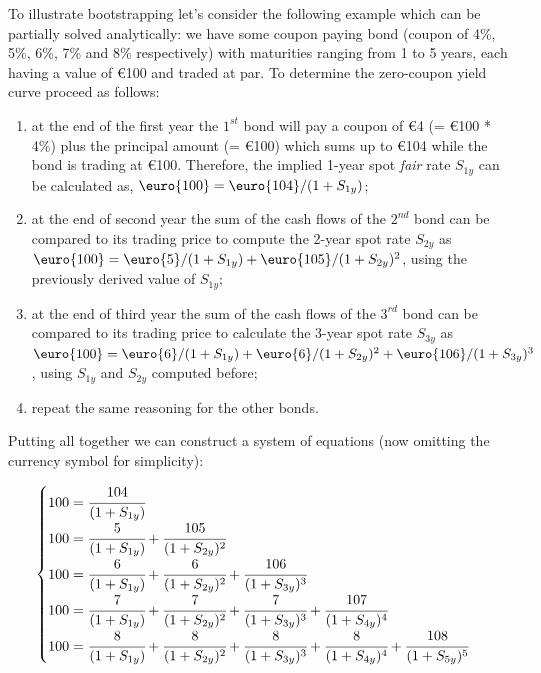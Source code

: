 To illustrate bootstrapping let's consider the following example which can be partially solved analytically: we have some coupon paying bond (coupon of 4\%, 5\%, 6\%, 7\% and 8\% respectively) with maturities ranging from 1 to 5 years, each having a value of \euro{100} and traded at par. To determine the zero-coupon yield curve proceed as follows:

\begin{enumerate}
\item at the end of the first year the $1^{st}$ bond will pay a coupon of \euro{4} (= \euro{100} * 4\%) plus the principal amount (= \euro{100}) which sums up to \euro{104} while the bond is trading at \euro{100}. Therefore, the implied 1-year spot \emph{fair} rate $S_{1y}$ can be calculated as, $\mbox{\euro{100}} = \mbox{\euro{104}} / (1 + S_{1y})$;

\item at the end of second year the sum of the cash flows of the $2^{nd}$ bond can be compared to its trading price to compute the 2-year spot rate $S_{2y}$ as $\mbox{\euro{100}} = \mbox{\euro{5}} / (1 + S_{1y}) + \mbox{\euro{105}} / (1 + S_{2y})^{2}$, using the previously derived value of $S_{1y}$;

\item at the end of third year the sum of the cash flows of the $3^{rd}$ bond can be compared to its trading price to calculate the 3-year spot rate $S_{3y}$ as $\mbox{\euro{100}} = \mbox{\euro{6}} / (1 + S_{1y}) + \mbox{\euro{6}} / (1 + S_{2y})^{2} + \mbox{\euro{106}} / (1 + S_{3y})^{3}$, using $S_{1y}$ and $S_{2y}$ computed before;

\item repeat the same reasoning for the other bonds.
\end{enumerate}

Putting all together we can construct a system of equations (now omitting the currency symbol for simplicity):

\begin{equation}
\begin{cases}
100 = \cfrac{104}{(1 + S_{1y})} \\
100 = \cfrac{5}{(1 + S_{1y})} + \cfrac{105}{(1 + S_{2y})^{2}} \\
100 = \cfrac{6} {(1 + S_{1y})} + \cfrac{6}{(1 + S_{2y})^{2}} + \cfrac{106} {(1 + S_{3y})^{3}} \\
100 = \cfrac{7} {(1 + S_{1y})} + \cfrac{7} {(1 + S_{2y})^{2}} + \cfrac{7} {(1 + S_{3y})^{3}} + \cfrac{107} {(1 + S_{4y})^{4}} \\
100 = \cfrac{8} {(1 + S_{1y})} + \cfrac{8} {(1 + S_{2y})^{2}}+ \cfrac{8} {(1 + S_{3y})^{3}} + \cfrac{8} {(1 + S_{4y})^{4}} + \cfrac{108} {(1 + S_{5y})^{5}}
\end{cases}
\label{eq:fifth_year_rate}
\end{equation}

